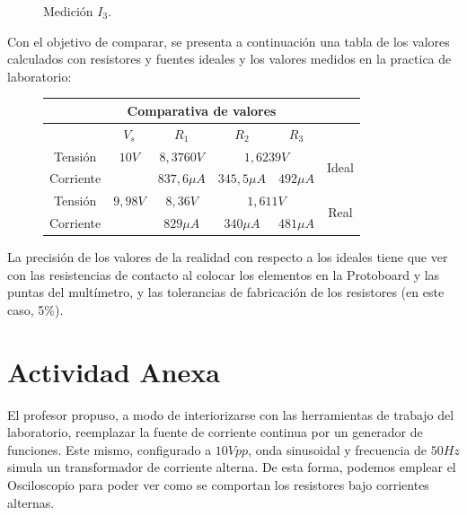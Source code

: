 \documentclass[a4paper,12pt, spanish]{report}
\newcommand\myemptypage{
  \newpage
  \null
  \thispagestyle{empty}
  \addtocounter{page}{-1}
  \newpage
}
\begin{document}
\begin{figure}[H]
\begin{minipage}{0.3\textwidth}
            \caption{Medición $I_3$.}
          \end{minipage}
      \end{figure}


      Con el objetivo de comparar, se presenta a continuación una tabla de los valores calculados con resistores y
      fuentes ideales y los valores medidos en la practica de laboratorio:
      \begin{figure}[!h]
        \centering
        \begin{tabular}[c]{|c||c|c|c|c||c|}
          \hline
          \multicolumn{6}{|c|}{Comparativa de valores}\\
          \hline
                    & $V_s$         & $R_1$         & $R_2$         & $R_3$         & \\
          \hline
          Tensión   & $10V$         & $8,3760V$     & \multicolumn{2}{|c||}{$1,6239V$} & \multirow{2}{*}{Ideal}\\
          \cline{1-5}
          Corriente &               & $837,6\mu A$  & $345,5\mu A$  & $492\mu A$    & \\
          \hline
          Tensión   & $9,98V$       & $8,36V$       & \multicolumn{2}{|c||}{$1,611V$}  & \multirow{2}{*}{Real}\\
          \cline{1-5}
          Corriente &               & $829\mu A$    & $340\mu A$    & $481\mu A$    & \\
          \hline
        \end{tabular}
      \end{figure}

      La precisión de los valores de la realidad con respecto a los ideales tiene que ver con las resistencias de
      contacto al colocar los elementos en la Protoboard y las puntas del multímetro, y las tolerancias de fabricación
      de los resistores (en este caso, 5\%).

    \myemptypage
    \chapter{Actividad Anexa}
      El profesor propuso, a modo de interiorizarse con las herramientas de trabajo del laboratorio, reemplazar la
      fuente de corriente continua por un generador de funciones. Este mismo, configurado a $10Vpp$, onda sinusoidal y
      frecuencia de $50Hz$ simula un transformador de corriente alterna. De esta forma, podemos emplear el Osciloscopio
      para poder ver como se comportan los resistores bajo corrientes alternas.
\end{document}
